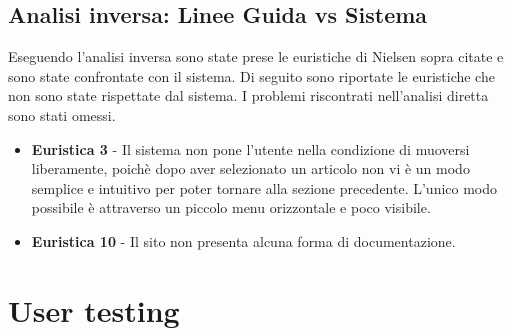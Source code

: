 \documentclass[12pt,a4paper]{report}
\begin{document}
\subsection{Analisi inversa: Linee Guida vs Sistema}
Eseguendo l'analisi inversa sono state prese le euristiche di Nielsen sopra citate e sono state confrontate con il sistema. Di seguito sono riportate le euristiche che non sono state rispettate dal sistema. I problemi riscontrati nell'analisi diretta sono stati omessi.
\begin{itemize}
  \item \textbf{Euristica 3} - Il sistema non pone l'utente nella condizione di muoversi liberamente, poichè dopo aver selezionato un articolo non vi è un modo semplice e intuitivo per poter tornare alla sezione precedente. L'unico modo possibile è attraverso un piccolo menu orizzontale e poco visibile.
  \item \textbf{Euristica 10} - Il sito non presenta alcuna forma di documentazione.
\end{itemize}
\section{User testing}
\end{document}
